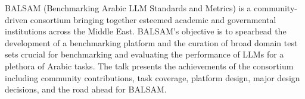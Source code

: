 BALSAM (Benchmarking Arabic LLM Standards and Metrics) is a community-driven consortium bringing together esteemed academic and governmental institutions across the Middle East. BALSAM's objective is to spearhead the development of a benchmarking platform and the curation of broad domain test sets crucial for benchmarking and evaluating the performance of LLMs for a plethora of Arabic tasks. The talk presents the achievements of the consortium including community contributions, task coverage, platform design, major design decisions, and the road ahead for BALSAM. 
